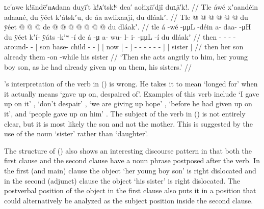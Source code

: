 \ex\label{ex:92-178-angry-son-sisters-given-up}%
%
\begingl
	\glpreamble	ʟe′awe k!āndē′nᴀdana duỵī′t k!ᴀ′tsk!ᵒ dea′ aołix̣ā′djî duʟ̣ā′k!. //
	\glpreamble	Tle áwé xʼaandéin adaané, du ÿéet kʼátskʼu, de áa awlixaají, du dláakʼ. //
	\gla	Tle  @ {}
		 @ {} @ {}
		 @ {} @ {} @ {}
		{} du ÿéet  @ {} @ {} @ {} {}
		{} de {}  @ {} {}
			 @ {} @ {} @ {} @ {} @ {} @ {} {}
		{} du dláakʼ. {} //
	\glb	tle á -wé
		 -μμL -déin
		a- daa-  -μH
		{} du ÿéet kʼí- ÿáts -kʼʷ -í {}
		{} de {} á -μ {}
			a- wu- l- i-  -μμL -í {}
		{} du dláakʼ {} //
	\glc	then  -
		 - -
		- around-  -
		{}[  son base- child - - {}]
		{}[ now {}[  - {}]
			- - - -
			 - - {}]
		{}[  sister {}] //
	\gld	then  {}
		 {} {}
		 {} {} {}
		{} her son  {} {} {} {}
		{} already {} them -on {}
			 {} {} {} {} {} -while {}
		{} his sister {} //
	\glft	‘Then she acts angrily to him, her young boy son, as he had already given up on them, his sisters.’
		//
\endgl
\xe

\citeauthor{swanton:1909}’s interpretation of the verb  in (\lastx) is wrong.
He takes it to mean ‘longed for’ when it actually means ‘gave up on, despaired of’.
Examples of this verb include  ‘I gave up on it’ \parencite[163.2239]{story-naish:1973},  ‘don’t despair’ \parencite[67.786]{story-naish:1973},  ‘we are giving up hope’ \parencite[67.787]{story-naish:1973},  ‘before he had given up on it’, and  ‘people gave up on him’ \parencite[both][f03/26]{leer:1973}.
The subject of the verb in (\lastx) is not entirely clear, but it is most likely the son and not the mother.
This is suggested by the use of the noun  ‘sister’ rather than  ‘daughter’.

The structure of (\lastx) also shows an interesting discourse pattern in that both the first clause and the second clause have a noun phrase postposed after the verb.
In the first (and main) clause the object  ‘her young boy son’ is right dislocated and in the second (adjunct) clause the object  ‘his sister’ is right dislocated.
The postverbal position of the object in the first clause also puts it in a position that could alternatively be analyzed as the subject position inside the second clause.

